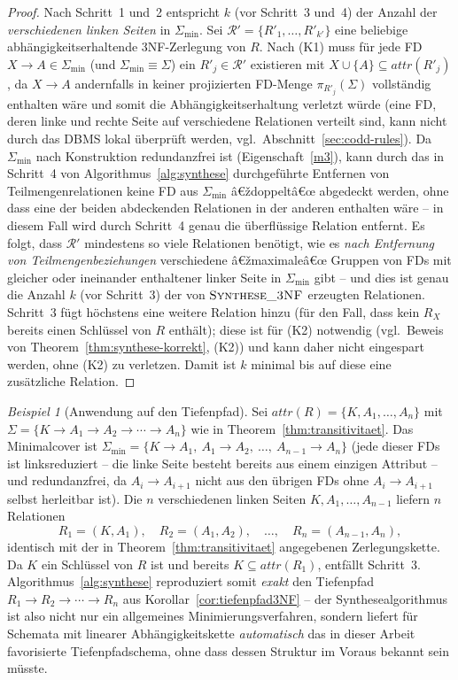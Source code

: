 ﻿\documentclass[a4paper,12pt]{report}
\theoremstyle{definition}
\theoremstyle{remark}
\newtheorem{example}{Beispiel}[chapter]
\newcommand{\att}{\mathit{attr}}
\begin{document}
\begin{proof}
Nach Schritt~1 und~2 entspricht $k$ (vor Schritt~3 und~4) der Anzahl
der \emph{verschiedenen linken Seiten} in $\Sigma_{\min}$. Sei
$\mathcal{R}'=\{R'_1,\ldots,R'_{k'}\}$ eine beliebige
abhängigkeitserhaltende 3NF-Zerlegung von $R$. Nach (K1) muss für jede
FD $X\to A\in\Sigma_{\min}$ (und $\Sigma_{\min}\equiv\Sigma$) ein
$R'_j\in\mathcal{R}'$ existieren mit $X\cup\{A\}\subseteq\att(R'_j)$,
da $X\to A$ andernfalls in keiner projizierten FD-Menge
$\pi_{R'_j}(\Sigma)$ vollständig enthalten wäre und somit die
Abhängigkeitserhaltung verletzt würde (eine FD, deren linke und rechte
Seite auf verschiedene Relationen verteilt sind, kann nicht durch das
DBMS lokal überprüft werden, vgl.\ Abschnitt~\ref{sec:codd-rules}).
Da $\Sigma_{\min}$ nach Konstruktion redundanzfrei ist
(Eigenschaft~\ref{m3}), kann durch das in Schritt~4 von
Algorithmus~\ref{alg:synthese} durchgeführte Entfernen von
Teilmengenrelationen keine FD aus $\Sigma_{\min}$ â€ždoppeltâ€œ
abgedeckt werden, ohne dass eine der beiden abdeckenden Relationen in
der anderen enthalten wäre -- in diesem Fall wird durch Schritt~4
genau die überflüssige Relation entfernt. Es folgt, dass
$\mathcal{R}'$ mindestens so viele Relationen benötigt, wie es
\emph{nach Entfernung von Teilmengenbeziehungen} verschiedene
â€žmaximaleâ€œ Gruppen von FDs mit gleicher oder ineinander enthaltener
linker Seite in $\Sigma_{\min}$ gibt -- und dies ist genau die Anzahl
$k$ (vor Schritt~3) der von $\textsc{Synthese\_3NF}$ erzeugten
Relationen. Schritt~3 fügt höchstens eine weitere Relation hinzu (für
den Fall, dass kein $R_X$ bereits einen Schlüssel von $R$ enthält);
diese ist für (K2) notwendig (vgl.\ Beweis von Theorem~\ref{thm:synthese-korrekt},
(K2)) und kann daher nicht eingespart werden, ohne (K2) zu verletzen.
Damit ist $k$ minimal bis auf diese eine zusätzliche Relation. \qedhere
\end{proof}

\begin{example}[Anwendung auf den Tiefenpfad]
\label{ex:synthese-tiefenpfad}
Sei $\att(R)=\{K,A_1,\ldots,A_n\}$ mit $\Sigma=\{K\to A_1\to A_2\to
\cdots\to A_n\}$ wie in Theorem~\ref{thm:transitivitaet}. Das
Minimalcover ist
$\Sigma_{\min}=\{K\to A_1,\ A_1\to A_2,\ \ldots,\ A_{n-1}\to A_n\}$
(jede dieser FDs ist linksreduziert -- die linke Seite besteht bereits
aus einem einzigen Attribut -- und redundanzfrei, da $A_i\to A_{i+1}$
nicht aus den übrigen FDs ohne $A_i\to A_{i+1}$ selbst herleitbar ist).
Die $n$ verschiedenen linken Seiten $K,A_1,\ldots,A_{n-1}$ liefern $n$
Relationen
\[
  R_1=(K,A_1),\quad R_2=(A_1,A_2),\quad\ldots,\quad
  R_n=(A_{n-1},A_n),
\]
identisch mit der in Theorem~\ref{thm:transitivitaet} angegebenen
Zerlegungskette. Da $K$ ein Schlüssel von $R$ ist und bereits
$K\subseteq\att(R_1)$, entfällt Schritt~3. Algorithmus~\ref{alg:synthese}
reproduziert somit \emph{exakt} den Tiefenpfad
$R_1\to R_2\to\cdots\to R_n$ aus
Korollar~\ref{cor:tiefenpfad3NF} -- der Synthesealgorithmus ist also
nicht nur ein allgemeines Minimierungsverfahren, sondern liefert für
Schemata mit linearer Abhängigkeitskette \emph{automatisch} das in
dieser Arbeit favorisierte Tiefenpfadschema, ohne dass dessen Struktur
im Voraus bekannt sein müsste.
\end{example}
\end{document}
